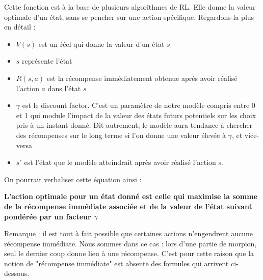 \documentclass[french]{article}
\begin{document}
    Cette fonction est à la base de plusieurs algorithmes de RL. Elle donne la valeur optimale d'un état, sans se pencher sur une action spécifique. Regardons-la plus en détail :
    \begin{itemize}
        \item $V(s)$ est un ŕéel qui donne la valeur d'un état $s$
        \item $s$ représente l'état
        \item $R(s, a)$ est la récompense immédiatement obtenue aprés avoir réalisé l'action $a$ dans l'état $s$
        \item $\gamma$ est le discount factor. C'est un paramètre de notre modèle compris entre 0 et 1 qui module l'impact de la valeur des états futurs potentiels sur les choix pris à un instant donné. Dit autrement, le modèle aura tendance à chercher des récompenses sur le long terme si l'on donne une valeur élevée à $\gamma$, et vice-versa
        \item $s'$ est l'état que le modèle atteindrait après avoir réalisé l'action s.
    \end{itemize}
    On pourrait verbaliser cette équation ainsi :

    {\centering \textbf{L'action optimale pour un état donné est celle qui maximise la somme de la récompense immédiate associée et de la valeur de l'état suivant pondérée par un facteur $\gamma$}}
    

    Remarque : il est tout à fait possible que certaines actions n'engendrent aucune récompense immédiate. Nous sommes dans ce cas : lors d'une partie de morpion, seul le dernier coup donne lieu à une récompense. C'est pour cette raison que la notion de "récompense immédiate" est absente des formules qui arrivent ci-dessous.
    
\end{document}
